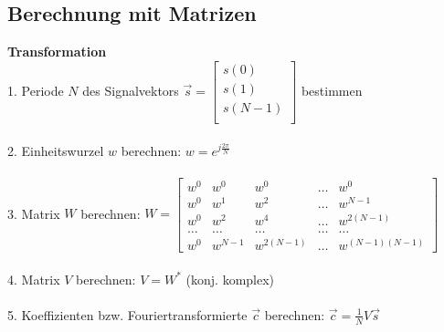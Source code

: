 	\subsection{Berechnung mit Matrizen}
		\textbf{Transformation}\\
		1. Periode $N$ des Signalvektors $\vec{s}=
		\begin{bmatrix}
		s(0) \\
		s(1) \\
		s(N-1)\\
		\end{bmatrix}$ bestimmen\\ \\
		2. Einheitswurzel $w$ berechnen: $w=e^{j\frac{2 \pi}{N}}$\\ \\
		3. Matrix $W$ berechnen: $W=
		\begin{bmatrix}
		w^0 & w^0 & w^0 & \ldots & w^0\\
		w^0 & w^1 & w^2 & \ldots & w^{N-1}\\
		w^0 & w^2 & w^4 & \ldots & w^{2(N-1)}\\
		\ldots & \ldots & \ldots & \ldots & \ldots\\
		w^0 & w^{N-1} & w^{2(N-1)} & \ldots & w^{(N-1)(N-1)}                        
		\end{bmatrix}$\\ \\
		4. Matrix $V$ berechnen: $V=W^*$ (konj. komplex)\\ \\
		5. Koeffizienten bzw. Fouriertransformierte $\vec{c}$ berechnen:
		$\vec{c}=\frac{1}{N}V\vec{s}$\\

